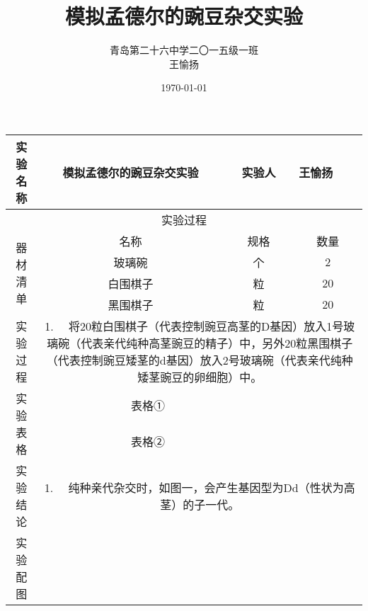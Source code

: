 \documentclass[11pt,a4paper,titlepage]{ctexart}
\title{\textbf{{\huge 模拟孟德尔的豌豆杂交实验}}}
\author{青岛第二十六中学\quad 二〇一五级一班\\王愉扬}
\date{\today}
\begin{document}
	\maketitle
	
	\begin{longtable}{|c|c|c|c|c|c|}
		\hline
		\multirow{1}{*}{实验名称} & \multirow{1}{*}{模拟孟德尔的豌豆杂交实验} & \multicolumn{2}{c|}{\multirow{1}{*}{实验人}} & \multicolumn{2}{l|}{\multirow{1}{*}{王愉扬}} \bigstrut[t]\\
		\hline
		\multicolumn{6}{|c|}{实验过程} \bigstrut\\
		\hline
		\multirow{4}[8]{*}{器材清单} & 名称 & \multicolumn{3}{c|}{规格} & 数量 \bigstrut\\
		\cline{2-6}  & 玻璃碗 & \multicolumn{3}{c|}{个} & 2 \bigstrut\\
		\cline{2-6}  & 白围棋子 & \multicolumn{3}{c|}{粒} & 20 \bigstrut\\
		\cline{2-6}  & 黑围棋子 & \multicolumn{3}{c|}{粒} & 20 \bigstrut\\
		\hline
		\multirow{6}[2]{*}{实验过程} & \multicolumn{5}{c|}{\multirow{6}[2]{30em}{1.   将20粒白围棋子（代表控制豌豆高茎的D基因）放入1号玻璃碗（代表亲代纯种高茎豌豆的精子）中，另外20粒黑围棋子（代表控制豌豆矮茎的d基因）放入2号玻璃碗（代表亲代纯种矮茎豌豆的卵细胞）中。}} \bigstrut[t]\\
		& \multicolumn{5}{c|}{} \\
		& \multicolumn{5}{c|}{} \\
		& \multicolumn{5}{c|}{} \\
		& \multicolumn{5}{c|}{} \\
		& \multicolumn{5}{c|}{} \bigstrut[b]\\
		\hline
		\multirow{2}[4]{*}{实验表格} & \multicolumn{2}{c|}{表格①} & \multicolumn{3}{r|}{} \bigstrut\\
		\cline{2-6}  & \multicolumn{2}{c|}{表格②} & \multicolumn{3}{r|}{} \bigstrut\\
		\hline
		\multirow{4}[2]{*}{实验结论} & \multicolumn{5}{c|}{\multirow{4}[2]{30em}{1.   纯种亲代杂交时，如图一，会产生基因型为Dd（性状为高茎）的子一代。}} \bigstrut[t]\\
		& \multicolumn{5}{c|}{} \\
		& \multicolumn{5}{c|}{} \\
		& \multicolumn{5}{c|}{} \bigstrut[b]\\
		\hline
		实验配图 & \multicolumn{5}{c|}{} \bigstrut\\
		\hline
	\end{longtable}%
	
	
\end{document}
